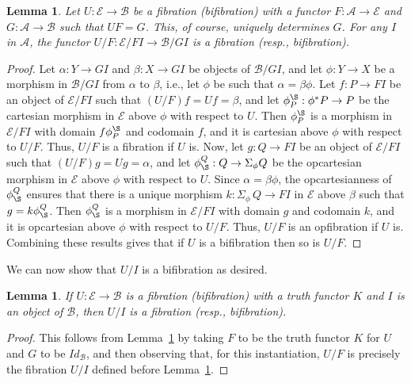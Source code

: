 \documentclass{LMCS}
\newcommand{\ra}{\rightarrow}
\newcommand\E{{\mathcal E}}
\newcommand\B{{\mathcal B}}
\newcommand\A{{\mathcal A}}
\theoremstyle{plain}
\newtheorem{lemma}[theorem]{Lemma}
\theoremstyle{remark}
\theoremstyle{definition}
\begin{document}
\begin{lemma}\label{lem:slbif}
  Let $U : \E \to \B$ be a fibration (bifibration) with a functor
  $F:\A\to \E$ and $G:\A\to \B$ such that $UF = G$. This, of course,
  uniquely determines $G$. For any $I$ in $\A$, the functor
  $U/F:\E/FI\to \B/G I$ is a fibration (resp., bifibration).
\end{lemma}
\begin{proof}
  Let $\alpha:Y \ra GI$ and $\beta:X \ra GI$ be objects of $\B/GI$, and
  let $\phi:Y \ra X$ be a morphism in $\B/GI$ from $\alpha$ to $\beta$,
  i.e., let $\phi$ be such that $\alpha = \beta \phi$. Let $f:P \ra
  FI$ be an object of $\E/FI$ such that $(U/F) f = U f = \beta$, and
  let $\phi^\S_P:\phi^*P \ra P$ be the cartesian morphism in $\E$ above
  $\phi$ with respect to $U$. Then $\phi^\S_P$ is a morphism in
  $\E/FI$ with domain $f \phi^\S_P$ and codomain $f$, and it is
  cartesian above $\phi$ with respect to $U/F$. Thus, $U/F$ is a
  fibration if $U$ is. Now, let $g:Q \ra FI$ be an object of $\E/FI$
  such that $(U/F) g = U g = \alpha$, and let $\phi^Q_\S: Q \ra
  \Sigma_\phi Q$ be the opcartesian morphism in $\E$ above $\phi$ with
  respect to $U$. Since $\alpha = \beta \phi$, the opcartesianness of
  $\phi^Q_\S$ ensures that there is a unique morphism $k:\Sigma_\phi\, Q
  \ra FI$ in $\E$ above $\beta$ such that $g = k \phi^Q_\S$. Then
  $\phi^Q_\S$ is a morphism in $\E/FI$ with domain $g$ and codomain
  $k$, and it is opcartesian above $\phi$ with respect to $U/F$. Thus,
  $U/F$ is an opfibration if $U$ is. Combining these results gives
  that if $U$ is a bifibration then so is $U/F$.
\end{proof}

We can now show that $U/I$ is a bifibration as desired.

\begin{lemma}\label{lem:bif}
  If $U : \E \to \B$ is a fibration (bifibration) with a truth functor $K$
  and $I$ is an object of $\B$, then $U/I$ is a fibration (resp.,
  bifibration).
\end{lemma}
\begin{proof}
This follows from Lemma~\ref{lem:slbif} by taking $F$ to be the truth
functor $K$ for $U$ and $G$ to be $\mathit{Id}_\B$, and then observing
that, for this instantiation, $U/F$ is precisely the fibration $U/I$
defined before Lemma~\ref{lem:slbif}.
\end{proof}
\end{document}
